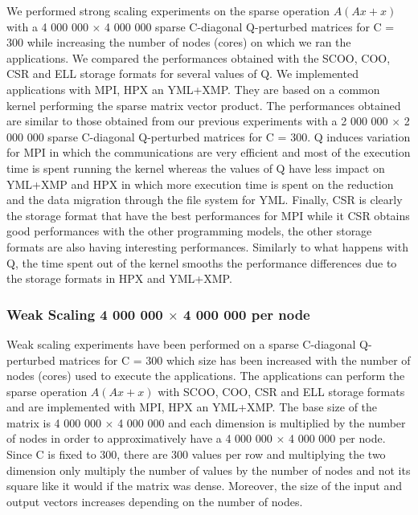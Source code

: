 We performed strong scaling experiments on the sparse operation $A(Ax+x)$ with a 4 000 000 $\times$ 4 000 000 sparse C-diagonal Q-perturbed matrices for C = 300 while increasing the number of nodes (cores) on which we ran the applications.
We compared the performances obtained with the SCOO, COO, CSR and ELL storage formats for several values of Q.
We implemented applications with MPI, HPX an YML+XMP.
They are based on a common kernel performing the sparse matrix vector product.
The performances obtained are similar to those obtained from our previous experiments with a 2 000 000 $\times$ 2 000 000 sparse C-diagonal Q-perturbed matrices for C = 300.
Q induces variation for MPI in which the communications are very efficient and most of the execution time is spent running the kernel whereas the values of Q have less impact on YML+XMP and HPX in which more execution time is spent on the reduction and the data migration through the file system for YML.
Finally, CSR is clearly the storage format that have the best performances for MPI while it CSR obtains good performances with the other programming models, the other storage formats are also having interesting performances.
Similarly to what happens with Q, the time spent out of the kernel smooths the performance differences due to the storage formats in HPX and YML+XMP.

\subsubsection{Weak Scaling 4 000 000 $\times$ 4 000 000 per node}

Weak scaling experiments have been performed on a sparse C-diagonal Q-perturbed matrices for C = 300 which size has been increased with the number of nodes (cores) used to execute the applications.
The applications can perform the sparse operation $A(Ax+x)$ with SCOO, COO, CSR and ELL storage formats and are implemented with MPI, HPX an YML+XMP.
The base size of the matrix is 4 000 000 $\times$ 4 000 000 and each dimension is multiplied by the number of nodes in order to approximatively have a 4 000 000 $\times$ 4 000 000 per node.
Since C is fixed to 300, there are 300 values per row and multiplying the two dimension only multiply the number of values by the number of nodes and not its square like it would if the matrix was dense.
Moreover, the size of the input and output vectors increases depending on the number of nodes.

